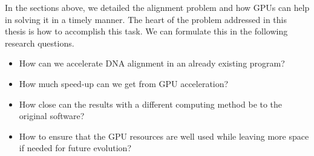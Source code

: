 In the sections above, we detailed the alignment problem and how GPUs can help in solving it in a timely manner. The heart of the problem addressed in this thesis is how to accomplish this task. We can formulate this in the following research questions.

\begin{itemize}
	\item How can we accelerate DNA alignment in an already existing program?
	\item How much speed-up can we get from GPU acceleration?
	\item How close can the results with a different computing method be to the original software?
	\item How to ensure that the GPU resources are well used while leaving more space if needed for future evolution?
\end{itemize}


